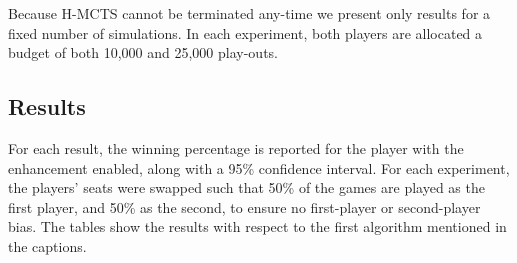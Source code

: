 \documentclass[a4paper]{llncs}
\begin{document}
Because H-MCTS cannot be terminated any-time we present only results for a fixed number of simulations. In each experiment, both players are allocated a budget of both 10,000 and 25,000 play-outs.

\subsection{Results}
\label{subsec:results}

For each result, the winning percentage is reported for the player with the enhancement enabled, along with a 95\% confidence interval. For each experiment, the players' seats were swapped such that 50\% of the games are played as the first player, and 50\% as the second, to ensure no first-player or second-player bias. The tables show the results with respect to the first algorithm mentioned in the captions.

\begin{table}[ht]
\centering
\tabcolsep=0.3cm
\vspace{4mm}
{\caption{H-MCTS vs. UCT with random play-outs, 1,000 games} \label{tab:uct_hmcts}}
\end{table}
\end{document}
